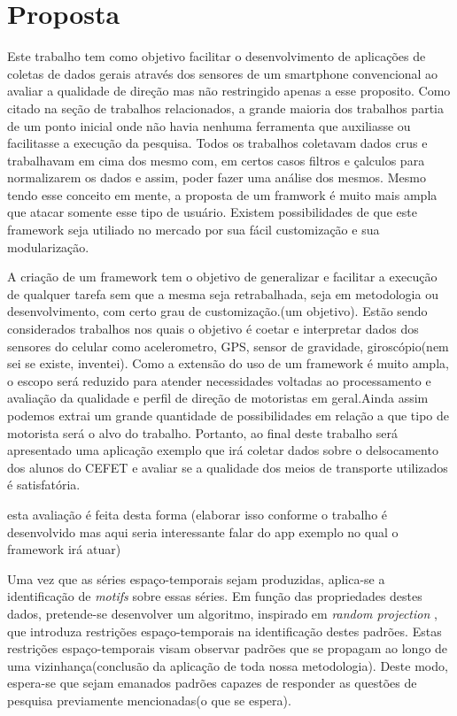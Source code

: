 \documentclass[12pt]{report} %
\begin{document}
\chapter{Proposta} 
\label{sec:proposta}
Este trabalho tem como objetivo facilitar o desenvolvimento de aplicações de coletas de dados gerais através dos sensores de um smartphone convencional ao avaliar a qualidade de direção mas não restringido apenas a esse proposito. Como citado na seção de trabalhos relacionados, a grande maioria dos trabalhos partia de um ponto inicial onde não havia nenhuma ferramenta que auxiliasse ou facilitasse a execução da pesquisa. Todos os trabalhos coletavam dados crus e trabalhavam em cima dos mesmo com, em certos casos filtros e çalculos para normalizarem os dados e assim, poder fazer uma análise dos mesmos. Mesmo tendo esse conceito em mente, a proposta de um framwork é muito mais ampla que atacar somente esse tipo de usuário. Existem possibilidades de que este framework seja utiliado no mercado por sua fácil customização e sua modularização.

A criação de um framework tem o objetivo de generalizar e facilitar a execução de qualquer tarefa sem que a mesma seja retrabalhada, seja em metodologia ou desenvolvimento, com certo grau de customização.(um objetivo). Estão sendo considerados trabalhos nos quais o objetivo é coetar e interpretar dados dos sensores do celular como acelerometro, GPS, sensor de gravidade, giroscópio(nem sei se existe, inventei). Como a extensão do uso de um framework é muito ampla, o escopo será reduzido para atender necessidades voltadas ao processamento e avaliação da qualidade e perfil de direção de motoristas em geral.Ainda assim podemos extrai um grande quantidade de possibilidades em relação a que tipo de motorista será o alvo do trabalho. Portanto, ao final deste trabalho será apresentado uma aplicação exemplo que irá coletar dados sobre o delsocamento dos alunos do CEFET e avaliar se a qualidade dos meios de transporte utilizados é satisfatória. 

esta avaliação é feita desta forma (elaborar isso conforme o trabalho é desenvolvido mas aqui seria interessante falar do app exemplo no qual o framework irá atuar)

Uma vez que as séries espaço-temporais sejam produzidas, aplica-se a identificação de \emph{motifs} sobre essas séries. Em função das propriedades destes dados, pretende-se desenvolver um algoritmo, inspirado em \emph{random projection} \citep{li2009probabilistic}, que introduza restrições espaço-temporais na identificação destes padrões. Estas restrições espaço-temporais visam observar padrões que se propagam ao longo de uma vizinhança(conclusão da aplicação de toda nossa metodologia). Deste modo, espera-se que sejam emanados padrões capazes de responder as questões de pesquisa previamente mencionadas(o que se espera).  
\end{document}
